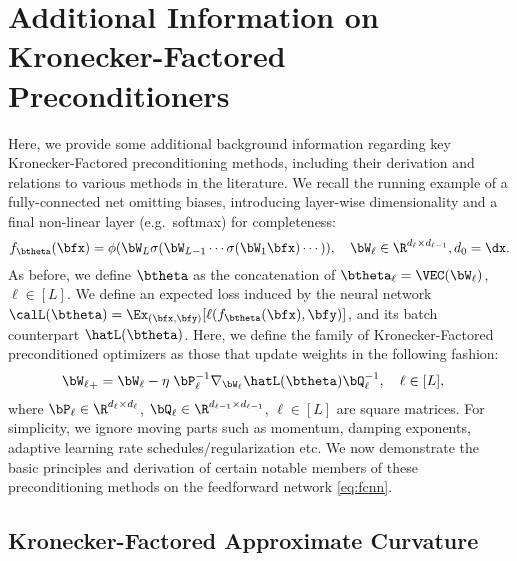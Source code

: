 \section{Additional Information on Kronecker-Factored Preconditioners}\label{sec:KF_derivations}

Here, we provide some additional background information regarding key Kronecker-Factored preconditioning methods, including their derivation and relations to various methods in the literature. We recall the running example of a fully-connected net omitting biases, introducing layer-wise dimensionality and a final non-linear layer (e.g.\ softmax) for completeness:
\begin{equation}\label{eq:fcnn}
    f_{\btheta}(\bfx) = \phi(\bW_L \sigma (\bW_{L-1} \cdots \sigma(\bW_1 \bfx) \cdots )), \quad \bW_\ell \in \R^{d_\ell \times d_{\ell - 1}}, d_0 = \dx.
\end{equation}
As before, we define $\btheta$ as the concatenation of $\btheta_\ell = \VEC(\bW_\ell)$, $\ell \in [L]$.
We define an expected loss induced by the neural network $\calL(\btheta) = \Ex_{(\bfx, \bfy)}[\ell(f_{\btheta}(\bfx), \bfy)]$, and its batch counterpart $\hatL(\btheta)$. Here, we define the family of Kronecker-Factored preconditioned optimizers as those that update weights in the following fashion:
\begin{align*}
    {\bW_\ell}_+ &= \bW_\ell - \eta\;\bP_\ell^{-1} \nabla_{\bW_\ell} \hatL(\btheta) \bQ_\ell^{-1},\quad \ell \in [L],
\end{align*}
where $\bP_\ell \in \R^{d_\ell \times d_\ell}$, $\bQ_\ell \in \R^{d_{\ell - 1} \times d_{\ell - 1}}$, $\ell \in [L]$ are square matrices.
For simplicity, we ignore moving parts such as momentum, damping exponents, adaptive learning rate schedules/regularization etc. We now demonstrate the basic principles and derivation of certain notable members of these preconditioning methods on the feedforward network \eqref{eq:fcnn}.

\subsection{Kronecker-Factored Approximate Curvature \KFAC}

